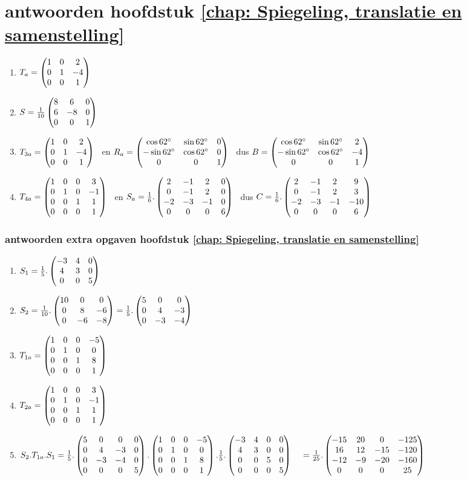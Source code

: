 \section{antwoorden  hoofdstuk \ref{chap: Spiegeling, translatie en samenstelling}}
\begin{enumerate}
	\item $ T_a = \begin{pmatrix} 1&0&2 \\ 0&1&-4 \\ 0&0&1 \end{pmatrix} $ 
	
	\item $   S = \frac{1}{10} \begin{pmatrix} 8&6&0 \\ 6&-8&0 \\ 0&0&1 \end{pmatrix}  $ 
	
	\item $ T_{3a} = \begin{pmatrix} 1&0&2 \\ 0&1&-4 \\ 0&0&1 \end{pmatrix} $ 
	\ en $ R_a= \begin{pmatrix} \cos 62 \degree &\sin 62 \degree&0 \\ -\sin 62 \degree&\cos 62 \degree&0 \\ 0&0&1 \end{pmatrix} $ 
	\ dus $ B= \begin{pmatrix} \cos 62 \degree &\sin 62 \degree&2 \\ -\sin 62 \degree&\cos 62 \degree&-4 \\ 0&0&1 \end{pmatrix} $ 
	
	
	\item $ T_{4a} = \begin{pmatrix} 1&0&0&3 \\ 0&1&0&-1 \\ 0&0&1&1 \\ 0&0&0&1 \end{pmatrix} $
	\ en $ S_a= \frac{1}{6}.\begin{pmatrix} 2&-1&2&0 \\ 0&-1&2&0 \\ -2&-3&-1&0 \\ 0&0&0&6 \end{pmatrix} $
	\ dus $ C = \frac{1}{6}. \begin{pmatrix} 2&-1&2&9 \\ 0&-1&2&3 \\ -2&-3&-1&-10 \\ 0&0&0&6 \end{pmatrix} $
	
	
\end{enumerate}

\subsubsection{antwoorden extra opgaven hoofdstuk \ref{chap: Spiegeling, translatie en samenstelling}}
\begin{enumerate}
	\item $   S_1 = \frac{1}{5} .\begin{pmatrix} -3&4&0 \\ 4&3&0 \\ 0&0&5 \end{pmatrix}  $ 
	\item $   S_2 = \frac{1}{10} .\begin{pmatrix} 10&0&0 \\ 0&8&-6 \\ 0&-6&-8 \end{pmatrix}  
	= \frac{1}{5} .\begin{pmatrix} 5&0&0 \\ 0&4&-3 \\ 0&-3&-4 \end{pmatrix}  $ 
	
	\item $ T_{1a} = \begin{pmatrix} 1&0&0&-5 \\ 0&1&0&0 \\ 0&0&1&8 \\ 0&0&0&1 \end{pmatrix} $
	\item $ T_{2a} = \begin{pmatrix} 1&0&0&3 \\ 0&1&0&-1 \\ 0&0&1&1 \\ 0&0&0&1 \end{pmatrix} $
	\item $ S_2 . T_{1a} . S_1 = \frac{1}{5} .\begin{pmatrix} 5&0&0&0 \\ 0&4&-3&0 \\ 0&-3&-4&0 \\ 0&0&0&5 \end{pmatrix} . 
	\begin{pmatrix} 1&0&0&-5 \\ 0&1&0&0 \\ 0&0&1&8 \\ 0&0&0&1 \end{pmatrix} . 
	\frac{1}{5} .	\begin{pmatrix} -3&4&0&0 \\ 4&3&0&0 \\ 0&0&5&0 \\ 0&0&0&5 \end{pmatrix} \\
	\quad	= \frac{1}{25} .	\begin{pmatrix} -15&20&0&-125 \\ 16&12&-15&-120 \\ -12&-9&-20&-160 \\ 0&0&0&25 \end{pmatrix} 
	$
	
\end{enumerate}

